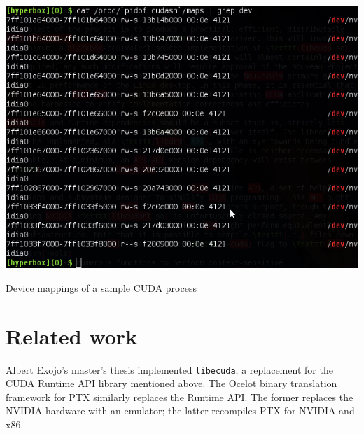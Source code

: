 \documentclass[letterpaper,10pt]{article}
\makeatletter
\newenvironment{figurehere}
{\def\@captype{figure}}
{}
\makeatother
\begin{document}
\begin{multicols}{2}
\begin{figurehere}
\centering
\includegraphics[width=\columnwidth]{texobjs/cudashmaps.png}
\caption{Device mappings of a sample CUDA process}
\end{figurehere}
\section{Related work}
Albert Exojo's master's thesis implemented \texttt{libecuda}\cite{exojo}, a replacement for
the CUDA Runtime API library mentioned above. The Ocelot\cite{ocelot} binary translation
framework for PTX similarly replaces the Runtime API. The former replaces the NVIDIA
hardware with an emulator; the latter recompiles PTX for NVIDIA and x86.


\end{multicols}
\end{document}
